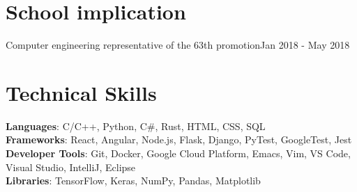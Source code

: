 \documentclass[letterpaper,11pt]{resume}
\begin{document}
\section{School implication}
    \resumeSubHeadingListStart
      \resumeProjectHeading
          {Computer engineering representative of the 63th promotion}{Jan 2018 - May 2018}
          \resumeItemListStart
          \resumeItemListEnd
    \resumeSubHeadingListEnd

%
\section{Technical Skills}
 \begin{itemize}[leftmargin=0.15in, label={}]
    \small{\item{
     \textbf{Languages}{: C/C++, Python, C\#, Rust, HTML, CSS, SQL} \\
     \textbf{Frameworks}{: React, Angular, Node.js, Flask, Django, PyTest, GoogleTest, Jest} \\
     \textbf{Developer Tools}{: Git, Docker, Google Cloud Platform, Emacs, Vim, VS Code, Visual Studio, IntelliJ, Eclipse} \\
     \textbf{Libraries}{: TensorFlow, Keras, NumPy, Pandas, Matplotlib}
    }}
 \end{itemize}


\end{document}
